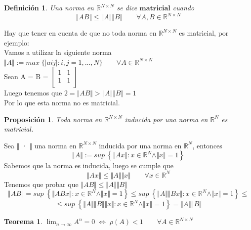 \documentclass[10pt, a4paper]{article}
\makeatletter
\renewenvironment{proof}[1][\proofname] {\par\pushQED{\qed}\normalfont\topsep6\p@\@plus6\p@\relax\trivlist\item[\hskip\labelsep\itshape\sffamily#1\@addpunct{.}]\ignorespaces}{\popQED\endtrivlist\@endpefalse}
\theoremstyle{theorem-style}
\newtheorem{nth}{Teorema}[section]
\newtheorem{nprop}{Proposición}[section]
\theoremstyle{definition-style}
\newtheorem{ndef}{Definición}[section]
\theoremstyle{remark-style}
\theoremstyle{example-style}
\theoremstyle{definition-style}
\theoremstyle{remark-style}
\makeatother
\begin{document}
\begin{ndef}
Una norma en $\mathbb{R}^{N \times N}$ se dice $\textbf{matricial}$ cuando
\[ \Vert AB \Vert \leq \Vert A \Vert \Vert B \Vert \qquad \forall A,B \in \mathbb{R}^{N \times N} \]
\end{ndef}

Hay que tener en cuenta de que no toda norma en $\mathbb{R}^{N \times N}$ es matricial, por ejemplo:\\
Vamos a utilizar la siguiente norma\\
$\Vert A \Vert := max \; \lbrace \vert a{ij} \vert : i, j = 1,...,N \rbrace \qquad \forall A \in \mathbb{R}^{N \times N}$ \\
Sean A = B = $\begin{bmatrix}
1 & 1 \\
1 & 1 \\
\end{bmatrix}$\\
Luego tenemos que
$2 = \Vert AB \Vert > \Vert A \Vert \Vert B \Vert = 1$\\
Por lo que esta norma no es matricial.\\

\begin{nprop}
Toda norma en $\mathbb{R}^{N \times N}$ inducida por una norma en $\mathbb{R}^N$ es matricial.
\end{nprop}

\begin{proof}
Sea $\Vert$ · $\Vert$ una norma en $\mathbb{R}^{N \times N}$ inducida por una norma en $\mathbb{R}^N$, entonces
\[ \Vert A \Vert := sup \; \left\lbrace \Vert Ax \Vert : x \in \mathbb{R}^N \wedge \Vert x \Vert = 1 \right\rbrace \]
Sabemos que la norma es inducida, luego se cumple que
\[ \Vert Ax \Vert \leq \Vert A \Vert \Vert x \Vert \qquad \forall x \in \mathbb{R}^N \]
Tenemos que probar que $\Vert AB \Vert \leq \Vert A \Vert \Vert B \Vert$\\
\[ \Vert AB \Vert = sup \; \left\lbrace \Vert ABx \Vert : x \in \mathbb{R}^N \wedge \Vert x \Vert = 1 \right\rbrace \leq sup \; \left\lbrace \Vert A \Vert \Vert Bx \Vert : x \in \mathbb{R}^N \wedge \Vert x \Vert = 1 \right\rbrace \leq \] \[ \leq sup \; \left\lbrace \Vert A \Vert \Vert B \Vert \Vert x \Vert : x \in \mathbb{R}^N \wedge \Vert x \Vert = 1 \right\rbrace = \Vert A \Vert \Vert B \Vert \]
\end{proof}

\begin{nth}
$\lim_{n \rightarrow \infty} A^n = 0 \; \Leftrightarrow \; \rho (A) < 1 \qquad \forall A \in \mathbb{R}^{N \times N} $
\end{nth}
\end{document}
